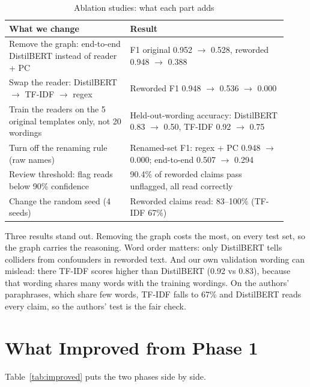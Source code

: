 \documentclass[conference]{IEEEtran}
\begin{document}
\begin{table}[t]
\centering
\caption{Ablation studies: what each part adds}
\label{tab:ablation}
\footnotesize
\setlength{\tabcolsep}{3pt}
\begin{tabular}{p{0.40\linewidth}p{0.52\linewidth}}
\toprule
What we change & Result \\
\midrule
Remove the graph: end-to-end DistilBERT instead of reader + PC & F1 original 0.952 $\to$ 0.528, reworded
0.948 $\to$ 0.388 \\
Swap the reader: DistilBERT $\to$ TF-IDF $\to$ regex & Reworded F1 0.948 $\to$ 0.536 $\to$ 0.000 \\
Train the readers on the 5 original templates only, not 20 wordings & Held-out-wording accuracy: DistilBERT 0.83
$\to$ 0.50, TF-IDF 0.92 $\to$ 0.75 \\
Turn off the renaming rule (raw names) & Renamed-set F1: regex + PC 0.948 $\to$ 0.000; end-to-end 0.507 $\to$
0.294 \\
Review threshold: flag reads below 90\% confidence & 90.4\% of reworded claims pass unflagged, all read
correctly \\
Change the random seed (4 seeds) & Reworded claims read: 83--100\% (TF-IDF 67\%) \\
\bottomrule
\end{tabular}
\end{table}

Three results stand out. Removing the graph costs the most, on every test set, so the graph carries the reasoning.
Word order matters: only DistilBERT tells colliders from confounders in reworded text. And our own validation
wording can mislead: there TF-IDF scores higher than DistilBERT (0.92 vs 0.83), because that wording shares many
words with the training wordings. On the authors' paraphrases, which share few words, TF-IDF falls to 67\% and
DistilBERT reads every claim, so the authors' test is the fair check.

\section{What Improved from Phase 1}
Table~\ref{tab:improved} puts the two phases side by side.
\end{document}
